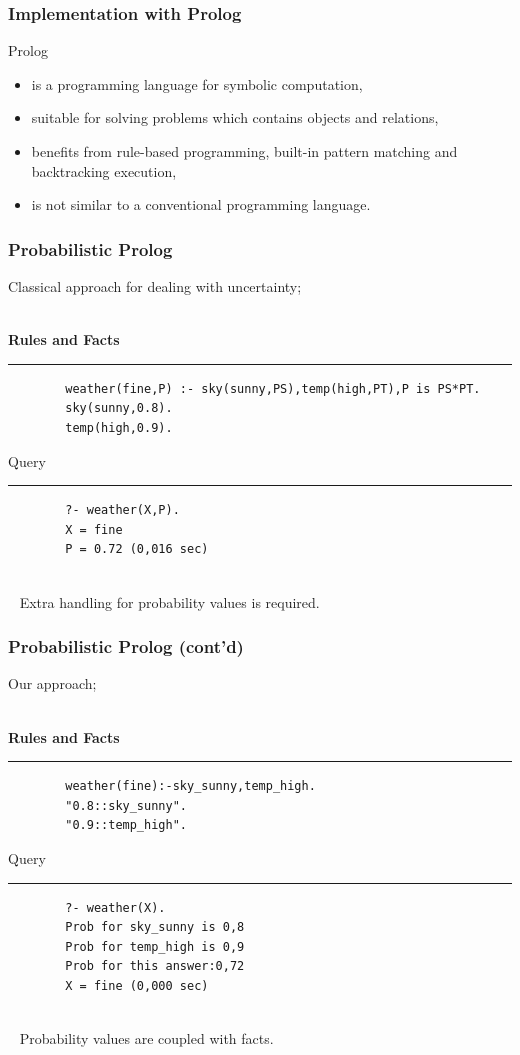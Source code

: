 \documentclass{beamer}
\newenvironment{mylisting}
{\begin{list}{}{\setlength{\leftmargin}{1em}}\item\scriptsize\bfseries}
{\end{list}}
\begin{document}
\frame
{
	\frametitle{Implementation with Prolog}
	Prolog 
	\begin{itemize}
	\item is a programming language for symbolic computation,
	\item suitable for solving problems which contains objects and relations,
	\item benefits from rule-based programming, built-in pattern matching and backtracking execution,
	\item is not similar to a conventional programming language.
	\end{itemize}	
}

\begin{frame}[fragile]
	\frametitle{Probabilistic Prolog}
	Classical approach for dealing with uncertainty;
  ~\\~
	\begin{mylisting}
		Rules and Facts
		\vspace*{2px}\hrule
		\begin{verbatim}
		weather(fine,P) :- sky(sunny,PS),temp(high,PT),P is PS*PT.
		sky(sunny,0.8).
		temp(high,0.9).
		\end{verbatim}
		
		Query
		\vspace*{2px}\hrule
		\begin{verbatim}
		?- weather(X,P).
		X = fine
		P = 0.72 (0,016 sec)
		\end{verbatim}
	\end{mylisting}
  ~\\~
	Extra handling for probability values is required.
\end{frame}

\begin{frame}[fragile]
	\frametitle{Probabilistic Prolog (cont'd)}
	Our approach;
  ~\\~
	\begin{mylisting}
		Rules and Facts
		\vspace*{2px}\hrule
		\begin{verbatim}
		weather(fine):-sky_sunny,temp_high.
		"0.8::sky_sunny".
		"0.9::temp_high".
		\end{verbatim}
		
		Query
		\vspace*{2px}\hrule
		\begin{verbatim}
		?- weather(X).
		Prob for sky_sunny is 0,8
		Prob for temp_high is 0,9
		Prob for this answer:0,72
		X = fine (0,000 sec)
		\end{verbatim}
	\end{mylisting}
	~\\~
	Probability values are coupled with facts.
\end{frame}
	
\end{document}
